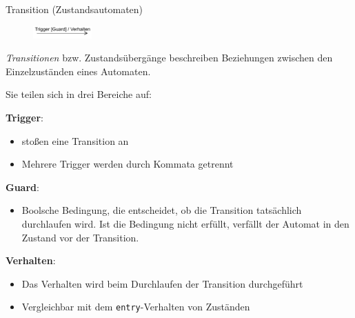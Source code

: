 \begin{diag}{Transition (Zustandsautomaten)}
    \begin{figure}
        \centering
        \includegraphics[width=0.2\textwidth]{includes/figures/defi_diagrams_state_transaktion.pdf}
    \end{figure}
    \emph{Transitionen} bzw. Zustandsübergänge beschreiben Beziehungen zwischen den Einzelzuständen eines Automaten.

    Sie teilen sich in drei Bereiche auf:

    \textbf{Trigger}:
    \begin{itemize}
        \item stoßen eine Transition an
        \item Mehrere Trigger werden durch Kommata getrennt
    \end{itemize}

    \textbf{Guard}:
    \begin{itemize}
        \item Boolsche Bedingung, die entscheidet, ob die Transition tatsächlich durchlaufen wird.
              Ist die Bedingung nicht erfüllt, verfällt der Automat in den Zustand vor der Transition.
    \end{itemize}

    \textbf{Verhalten}:
    \begin{itemize}
        \item Das Verhalten wird beim Durchlaufen der Transition durchgeführt
        \item Vergleichbar mit dem \texttt{entry}-Verhalten von Zuständen
    \end{itemize}
\end{diag}

